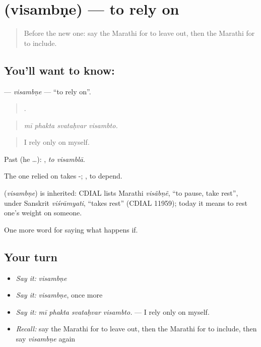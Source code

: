 \section[\texorpdfstring{\mr{विसंबणे} (visambṇe)}{विसंबणे (visambṇe)}]{ (visambṇe) — to rely on}

\label{lesson:MR-C387-visambne}



\begin{quote}
Before the new one: say the Marathi for to leave out, then the Marathi for to include.
\end{quote}

\subsection*{You'll want to know: }
\textbf{} — \emph{visambṇe} — \textquotedblleft{}to rely on\textquotedblright{}.

\begin{quote}
   .
\end{quote}

\begin{quote}
\emph{mī phakta svataḥvar visambto.}
\end{quote}

\begin{quote}
I rely only on myself.
\end{quote}

Past (he …):  , \emph{to visamblā}.

The one relied on takes -;  , to depend.

\begin{cousinweb}
\textbf{} (\emph{visambṇe}) is inherited: CDIAL lists Marathi \emph{visãbṇẽ}, \textquotedblleft{}to pause, take rest\textquotedblright{}, under Sanskrit \emph{viśrāmyati}, \textquotedblleft{}takes rest\textquotedblright{} (CDIAL 11959); today it means to rest one's weight on someone.
\end{cousinweb}

\begin{grammarlens}[title={What you've built}]
One more word for saying what happens if.
\end{grammarlens}

\subsection*{Your turn}
\begin{itemize}
\raggedright
  \item \emph{Say it:} \emph{visambṇe}
  \item \emph{Say it:} \emph{visambṇe}, once more
  \item \emph{Say it:} \emph{mī phakta svataḥvar visambto.} — I rely only on myself.
  \item \emph{Recall:} say the Marathi for to leave out, then the Marathi for to include, then say \emph{visambṇe} again
\end{itemize}

